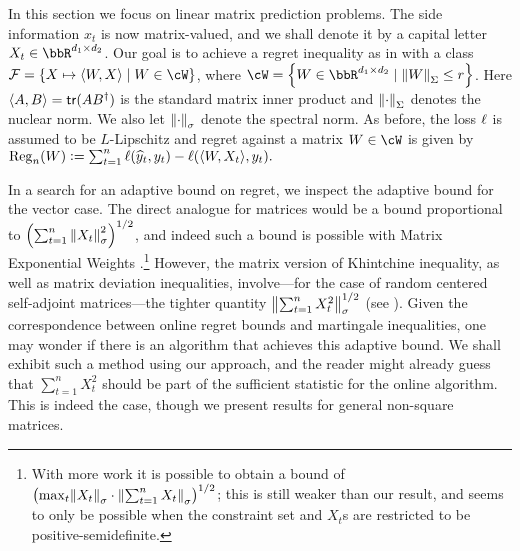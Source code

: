 
In this section we focus on linear matrix prediction problems. The side information $x_t$ is now matrix-valued, and we shall denote it by a capital letter $X_t\in\bbR^{d_1\times{}d_2}$. Our goal is to achieve a regret inequality as in  with a class $\F=\crl*{X\mapsto\tri*{W,X}\mid{} W\in\cW}$, where $\cW=\crl*{W\in\bbR^{d_1\times{}d_2}\mid{}\nrm*{W}_{\Sigma}\leq{}r}$. Here $\tri*{A,B}=\Tr(AB^{\trn})$ is the standard matrix inner product and $\nrm*{\cdot}_{\Sigma}$ denotes the nuclear norm. We also let $\nrm*{\cdot}_{\sigma}$ denote the spectral norm. As before, the loss $\loss$ is assumed to be $L$-Lipschitz and regret against a matrix $W\in\cW$ is given by
$
  \reg(W)\ldef \sum_{t=1}^{n}\loss(\pred_t, y_t) - \loss(\tri*{W,X_t}, y_t).
$

In a search for an adaptive bound on regret, we inspect the adaptive bound  for the vector case. The direct analogue for matrices would be a bound proportional to $\left(\sum_{t=1}^n \norm{X_t}^2_\sigma \right)^{1/2}$, and indeed such a bound is possible with Matrix Exponential Weights \cite[Theorem 13]{HazKalSha12}.\footnote{With more work it is possible to obtain a bound of $\left(\max_{t}\nrm*{X_t}_{\sigma}\cdot\nrm*{\sum_{t=1}^nX_t}_\sigma \right)^{1/2}$; this is still weaker than our result, and seems to only be possible when the constraint set and $X_t$s are restricted to be positive-semidefinite.} However, the matrix version of Khintchine inequality, as well as matrix deviation inequalities, involve---for the case of random centered self-adjoint matrices---the tighter quantity $\norm{\sum_{t=1}^n X_t^2}^{1/2}_\sigma$ (see \citep{tropp2012user,mackey2014matrix}). Given the correspondence between online regret bounds and martingale inequalities, one may wonder if there is an algorithm that achieves this adaptive bound. We shall exhibit such a method using our approach, and the reader might already guess that $\sum_{t=1}^n X_t^2$ should be part of the sufficient statistic for the online algorithm. This is indeed the case, though we present results for general non-square matrices.


